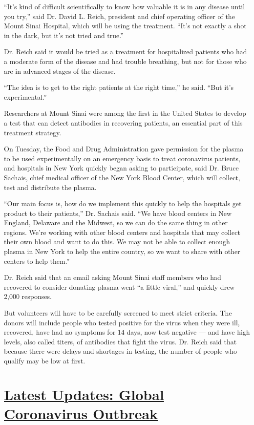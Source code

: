 ``It's kind of difficult scientifically to know how valuable it is in
any disease until you try,'' said Dr. David L. Reich, president and
chief operating officer of the Mount Sinai Hospital, which will be using
the treatment. ``It's not exactly a shot in the dark, but it's not tried
and true.''

Dr. Reich said it would be tried as a treatment for hospitalized
patients who had a moderate form of the disease and had trouble
breathing, but not for those who are in advanced stages of the disease.

``The idea is to get to the right patients at the right time,'' he said.
``But it's experimental.''

Researchers at Mount Sinai were among the first in the United States to
develop a test that can detect antibodies in recovering patients, an
essential part of this treatment strategy.

On Tuesday, the Food and Drug Administration gave permission for the
plasma to be used experimentally on an emergency basis to treat
coronavirus patients, and hospitals in New York quickly began asking to
participate, said Dr. Bruce Sachais, chief medical officer of the New
York Blood Center, which will collect, test and distribute the plasma.

``Our main focus is, how do we implement this quickly to help the
hospitals get product to their patients,'' Dr. Sachais said. ``We have
blood centers in New England, Delaware and the Midwest, so we can do the
same thing in other regions. We're working with other blood centers and
hospitals that may collect their own blood and want to do this. We may
not be able to collect enough plasma in New York to help the entire
country, so we want to share with other centers to help them.''

Dr. Reich said that an email asking Mount Sinai staff members who had
recovered to consider donating plasma went ``a little viral,'' and
quickly drew 2,000 responses.

But volunteers will have to be carefully screened to meet strict
criteria. The donors will include people who tested positive for the
virus when they were ill, recovered, have had no symptoms for 14 days,
now test negative --- and have high levels, also called titers, of
antibodies that fight the virus. Dr. Reich said that because there were
delays and shortages in testing, the number of people who qualify may be
low at first.

\hypertarget{latest-updates-global-coronavirus-outbreak}{%
\section{\texorpdfstring{\href{https://www.nytimes.com/2020/08/04/world/coronavirus-cases.html?action=click\&pgtype=Article\&state=default\&region=MAIN_CONTENT_1\&context=storylines_live_updates}{Latest
Updates: Global Coronavirus
Outbreak}}{Latest Updates: Global Coronavirus Outbreak}}\label{latest-updates-global-coronavirus-outbreak}}

